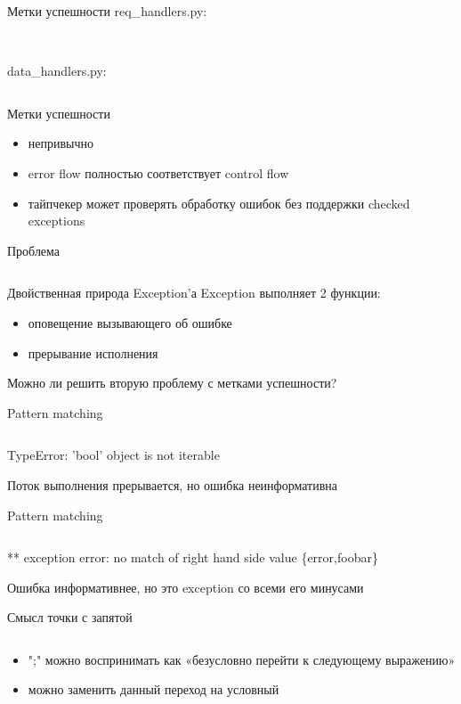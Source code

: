\documentclass[10pt]{beamer}
\newcommand{\code}[4]{\inputminted[linenos, frame=none, firstline=#2, lastline=#3,
  framesep=10pt, bgcolor=lightgray]{#4}{#1}}
\begin{document}
\begin{frame}{Метки успешности}
  req\_handlers.py:
  \code{code.py}{40}{42}{python}\vspace{5pt}\\
  data\_handlers.py:
  \code{code.py}{44}{46}{python}
\end{frame}

\begin{frame}{Метки успешности}
  \begin{itemize}
  \item непривычно
  \item error flow полностью соответствует control flow
  \item тайпчекер может проверять обработку ошибок без поддержки checked exceptions
  \end{itemize}
\end{frame}

\begin{frame}{Проблема}
  \code{code.py}{48}{55}{python}
\end{frame}

\begin{frame}{Двойственная природа Exception'а}
  Exception выполняет 2 функции:
  \begin{itemize}
  \item оповещение вызывающего об ошибке
  \item прерывание исполнения
  \end{itemize}
  Можно ли решить вторую проблему с метками успешности?
\end{frame}

\begin{frame}{Pattern matching}
  \code{code.py}{57}{64}{python}
  \begin{block}{}
    TypeError: 'bool' object is not iterable
  \end{block}
  Поток выполнения прерывается, но ошибка неинформативна
\end{frame}

\begin{frame}{Pattern matching}
  \code{code.erl}{24}{27}{erlang}
  \begin{block}{}
    ** exception error: no match of right hand side value \{error,foobar\}
  \end{block}
  Ошибка информативнее, но это exception со всеми его минусами
\end{frame}

\begin{frame}{Смысл точки с запятой}
  \code{code.py}{66}{67}{python}
  \begin{itemize}
  \item ";" можно воспринимать как «безусловно перейти к следующему выражению»
  \item можно заменить данный переход на условный
  \end{itemize}
\end{frame}
\end{document}
